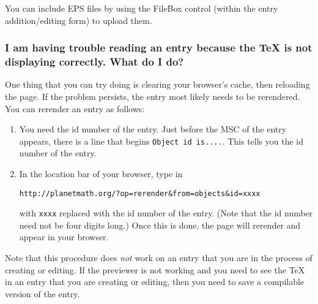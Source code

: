 You can include EPS files by using the FileBox control (within the entry addition/editing form) to upload them.

\subsubsection*{I am having trouble reading an entry because the \TeX{} is not displaying correctly. What do I do?}
One thing that you can try doing is clearing your browser's cache, then reloading the page. If the problem persists, the entry most likely needs to be rerendered. You can rerender an entry as follows:

\begin{enumerate}
\item You need the id number of the entry. Just before the MSC of the entry appears, there is a line that begins \texttt{Object id is....}. This tells you the id number of the entry.
\item In the location bar of your browser, type in

\begin{center}
\begin{verbatim}
http://planetmath.org/?op=rerender&from=objects&id=xxxx
\end{verbatim}
\end{center}

with \texttt{xxxx} replaced with the id number of the entry. (Note that the id number need not be four digits long.) Once this is done, the page will rerender and appear in your browser.
\end{enumerate}

Note that this procedure does \emph{not} work on an entry that you are in the process of creating or editing. If the previewer is not working and you need to see the \TeX{} in an entry that you are creating or editing, then you need to save a compilable version of the entry.
